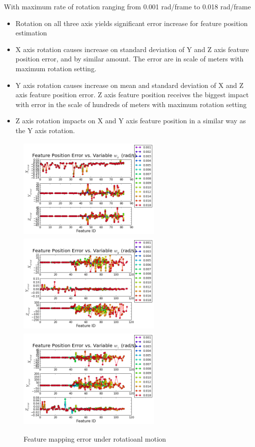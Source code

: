 With maximum rate of rotation ranging from 0.001 rad/frame to 0.018
rad/frame

\begin{itemize}
  \item Rotation on all three axis yields significant error increase
  for feature position estimation
  \item X axis rotation causes increase on standard deviation of Y and
  Z axis feature position error, and by similar amount. The error are
  in scale of meters with maximum rotation setting.
  \item Y axis rotation causes increase on mean and standard deviation
  of X and Z axis feature position error. Z axis feature position
  receives the biggest impact with error in the scale of hundreds of
  meters with maximum rotation setting
  \item Z axis rotation impacts on X and Y axis feature position in a
  similar way as the Y axis rotation.
\end{itemize}

\begin{figure}[h]
  \centering
  \includegraphics[width=7cm, height=5cm]{./Figures/SimulationFigures/Figure17.png}
  \includegraphics[width=7cm, height=5cm]{./Figures/SimulationFigures/Figure18.png}
  \includegraphics[width=7cm, height=5cm]{./Figures/SimulationFigures/Figure19.png}
  \caption{Feature mapping error under rotatioanl motion}
  \label{fig:simfig17-19}
\end{figure}

